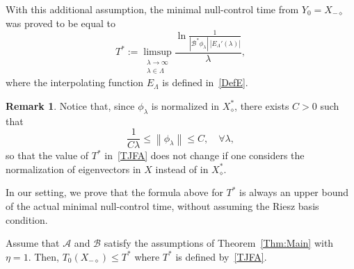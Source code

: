 \documentclass[10pt]{amsart}
\theoremstyle{definition}\newtheorem{defi}[theo]{Definition}\newtheorem{rema}[theo]{Remark}\newtheorem{exam}[theo]{Example}\newtheorem{exem}[theo]{Example}\newtheorem{nota}[theo]{Notation}
\newcommand\A{\mathcal{A}}
\newcommand\B{\mathcal{B}}
\newcommand\Bs{\mathcal{B}^*}
\newcommand{\Xalphas}{X_\diamond^*}
\newcommand{\Xmalpha}{X_{-\diamond}}
\newcommand{\Fzp}{Y_0}
\newcommand{\normeX}[1]{\left\| #1 \right\|}
\let\oldforall\forall
\renewcommand*{\forall}{\mathrel{\oldforall}}
\begin{document}
\begingroup
With this additional assumption, the minimal null-control time from $\Fzp=\Xmalpha$ was proved to be equal to
\begin{equation}\label{TJFA}
T^*:=\limsup_{\substack{\lambda\to \infty\\ \lambda\in \Lambda}} \frac{\ln \frac{1}{| \Bs\phi_\lambda | \: | E_\Lambda' (\lambda) |}}{ \lambda },
\end{equation}
where the interpolating function $E_\Lambda$ is defined in~\eqref{DefE}.
\endgroup

\begin{rema}
Notice that, since $\phi_\lambda$ is normalized in $\Xalphas$, there exists $C>0$ such that
\[
\frac{1}{C \lambda} \leq \normeX{\phi_\lambda} \leq C, \quad \forall \lambda,
\]
so that the value of $T^*$ in~\eqref{TJFA} does not change if one considers the normalization of eigenvectors in $X$ instead of in $\Xalphas$.
\end{rema}

In our setting, we prove that the formula above for $T^*$ is always an upper bound of the actual minimal null-control time, without assuming the Riesz basis condition.

\begin{prop}\label{Prop:T_0<T*}
Assume that $\A$ and $\B$ satisfy the assumptions of Theorem~\ref{Thm:Main} with $\eta=1$. Then, $T_0(\Xmalpha) \leq T^*$ where $T^*$ is defined by~\eqref{TJFA}.
\end{prop}
\end{document}
